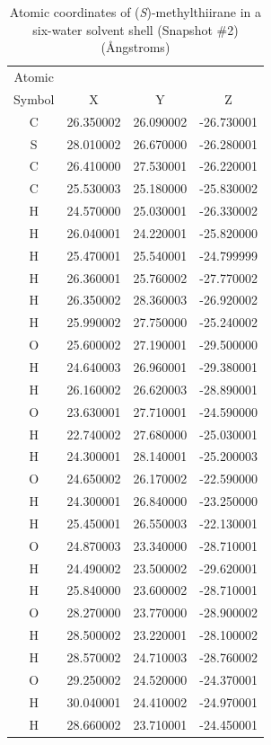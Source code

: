 \renewcommand*{\arraystretch}{1.0}
\begin{table}
    \centering
    \caption{Atomic coordinates of (\textit{S})-methylthiirane in a six-water solvent shell (Snapshot \#2)
 (\AA ngstroms)}
    \label{metthi2_6}
    \begin{tabular}{ c c c c }
    \hline
    \hline
    Atomic & & & \\
    Symbol & X & Y & Z \\
    \hline
	C &  26.350002 &  26.090002 &  -26.730001 \\
	S &  28.010002 &  26.670000 &  -26.280001 \\
	C &  26.410000 &  27.530001 &  -26.220001 \\
	C &  25.530003 &  25.180000 &  -25.830002 \\
	H &  24.570000 &  25.030001 &  -26.330002 \\
	H &  26.040001 &  24.220001 &  -25.820000 \\
	H &  25.470001 &  25.540001 &  -24.799999 \\
	H &  26.360001 &  25.760002 &  -27.770002 \\
	H &  26.350002 &  28.360003 &  -26.920002 \\
	H &  25.990002 &  27.750000 &  -25.240002 \\
	O &  25.600002 &  27.190001 &  -29.500000 \\
	H &  24.640003 &  26.960001 &  -29.380001 \\
	H &  26.160002 &  26.620003 &  -28.890001 \\
	O &  23.630001 &  27.710001 &  -24.590000 \\
	H &  22.740002 &  27.680000 &  -25.030001 \\
	H &  24.300001 &  28.140001 &  -25.200003 \\
	O &  24.650002 &  26.170002 &  -22.590000 \\
	H &  24.300001 &  26.840000 &  -23.250000 \\
	H &  25.450001 &  26.550003 &  -22.130001 \\
	O &  24.870003 &  23.340000 &  -28.710001 \\
	H &  24.490002 &  23.500002 &  -29.620001 \\
	H &  25.840000 &  23.600002 &  -28.710001 \\
	O &  28.270000 &  23.770000 &  -28.900002 \\
	H &  28.500002 &  23.220001 &  -28.100002 \\
	H &  28.570002 &  24.710003 &  -28.760002 \\
	O &  29.250002 &  24.520000 &  -24.370001 \\
	H &  30.040001 &  24.410002 &  -24.970001 \\
	H &  28.660002 &  23.710001 &  -24.450001 \\
    \hline
    \hline
    \end{tabular}
\end{table}
